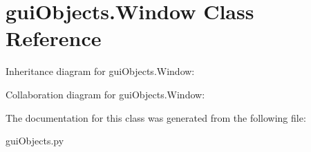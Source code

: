 \hypertarget{classguiObjects_1_1Window}{}\section{gui\+Objects.\+Window Class Reference}
\label{classguiObjects_1_1Window}


Inheritance diagram for gui\+Objects.\+Window\+:


Collaboration diagram for gui\+Objects.\+Window\+:


The documentation for this class was generated from the following file\+:\begin{DoxyCompactItemize}
\item 
gui\+Objects.\+py\end{DoxyCompactItemize}
